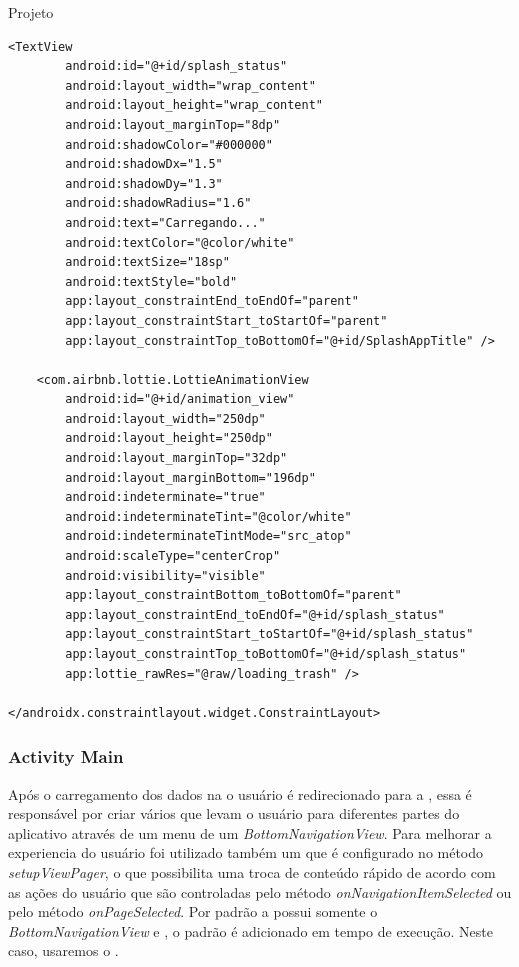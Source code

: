 \documentclass[
	12pt,				%
	openright,			%
	twoside,			%
	a4paper,			%
	english,			%
	french,				%
	spanish,			%
	brazil				%
	]{abntex2}
\begin{document}
\begin{chapter}{Projeto}
\begin{lstlisting}[numbers=none,basicstyle=\small,caption={ActivitySplash.xml}, title={ActivitySplash.xml}, label={activity_splash.xml}]
    <TextView
        android:id="@+id/splash_status"
        android:layout_width="wrap_content"
        android:layout_height="wrap_content"
        android:layout_marginTop="8dp"
        android:shadowColor="#000000"
        android:shadowDx="1.5"
        android:shadowDy="1.3"
        android:shadowRadius="1.6"
        android:text="Carregando..."
        android:textColor="@color/white"
        android:textSize="18sp"
        android:textStyle="bold"
        app:layout_constraintEnd_toEndOf="parent"
        app:layout_constraintStart_toStartOf="parent"
        app:layout_constraintTop_toBottomOf="@+id/SplashAppTitle" />

    <com.airbnb.lottie.LottieAnimationView
        android:id="@+id/animation_view"
        android:layout_width="250dp"
        android:layout_height="250dp"
        android:layout_marginTop="32dp"
        android:layout_marginBottom="196dp"
        android:indeterminate="true"
        android:indeterminateTint="@color/white"
        android:indeterminateTintMode="src_atop"
        android:scaleType="centerCrop"
        android:visibility="visible"
        app:layout_constraintBottom_toBottomOf="parent"
        app:layout_constraintEnd_toEndOf="@+id/splash_status"
        app:layout_constraintStart_toStartOf="@+id/splash_status"
        app:layout_constraintTop_toBottomOf="@+id/splash_status"
        app:lottie_rawRes="@raw/loading_trash" />

</androidx.constraintlayout.widget.ConstraintLayout>
\end{lstlisting}
\subsubsection{Activity Main} \label{main_activity}
Após o carregamento dos dados na  o usuário é redirecionado para a , essa  é responsável por criar vários  que levam o usuário para diferentes partes do aplicativo através de um menu de um \textit{BottomNavigationView}. Para melhorar a experiencia do usuário foi utilizado também um  que é configurado no método \textit{setupViewPager}, o que possibilita uma troca de conteúdo rápido de acordo com as ações do usuário que são controladas pelo método \textit{onNavigationItemSelected} ou pelo método \textit{onPageSelected}. Por padrão a  possui somente o \textit{BottomNavigationView} e , o  padrão é adicionado em tempo de execução. Neste caso, usaremos o .


\end{chapter}
\end{document}

